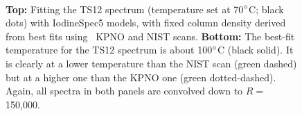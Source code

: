\begin{figure}
\centering
{}\
\caption{{\bf Top:} Fitting the TS12 spectrum (temperature set at
70$^{\circ}$C; black dots) with IodineSpec5 models, with fixed column
density derived from best fits using \het\ KPNO and NIST scans. {\bf
Bottom:} The best-fit temperature for the TS12 spectrum is about
100$^{\circ}$C (black solid). It is clearly at a lower temperature than
the NIST scan (green dashed) but at a higher one than the KPNO one
(green dotted-dashed). Again, all spectra in both panels are convolved
down to $R=$ 150,000.
\label{het:fig:ts12fit}}
\end{figure}
